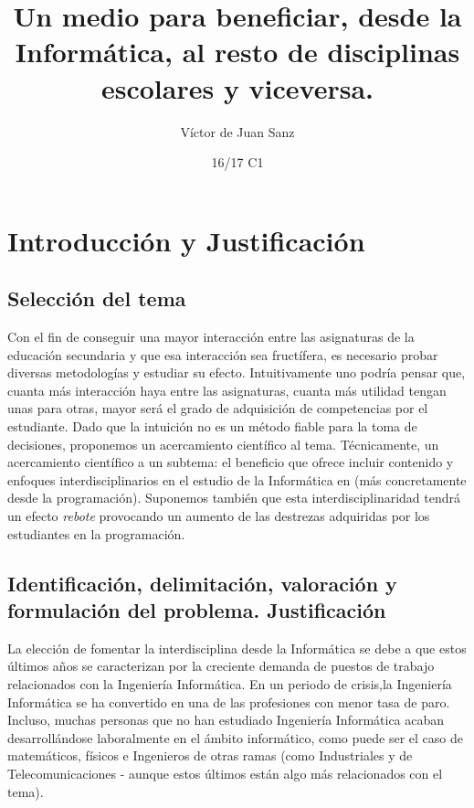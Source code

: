 \documentclass[palatino,miniheader]{apuntesURJC}
\title{Un medio para beneficiar, desde la Informática, al resto de disciplinas escolares y viceversa.}
\author{Víctor de Juan Sanz}
\date{16/17 C1}
\begin{document}
\pagestyle{plain}
\maketitle

\tableofcontents
\newpage




\chapter{Introducción y Justificación}
\section{Selección del tema}

Con el fin de conseguir una mayor interacción entre las asignaturas de la educación secundaria y que esa interacción sea fructífera, es necesario probar diversas metodologías y estudiar su efecto.
%
Intuitivamente uno podría pensar que, cuanta más interacción haya entre las asignaturas, cuanta más utilidad tengan unas para otras, mayor será el grado de adquisición de competencias por el estudiante.
%
Dado que la intuición no es un método fiable para la toma de decisiones, proponemos un acercamiento científico al tema. 
%
Técnicamente, un acercamiento científico a un subtema: el beneficio que ofrece incluir contenido y enfoques interdisciplinarios en el estudio de la Informática en  (más concretamente desde la programación).
%
Suponemos también que esta interdisciplinaridad tendrá un efecto \textit{rebote} provocando un aumento de las destrezas adquiridas por los estudiantes en la programación.

\section{Identificación, delimitación, valoración y formulación del problema. Justificación}

La elección de fomentar la interdisciplina desde la Informática se debe a que estos últimos años se caracterizan por la creciente demanda de puestos de trabajo relacionados con la Ingeniería Informática.
%
En un periodo de crisis,la Ingeniería Informática se ha convertido en una de las profesiones con menor tasa de paro. 
%
Incluso, muchas personas que no han estudiado Ingeniería Informática acaban desarrollándose laboralmente en el ámbito informático, como puede ser el caso de  matemáticos, físicos e Ingenieros de otras ramas (como Industriales y de Telecomunicaciones - aunque estos últimos están algo más relacionados con el tema).
\end{document}
